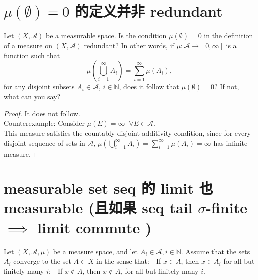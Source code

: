 \documentclass[lang=cn,11pt]{elegantbook}
\begin{document}
\section{\(\mu(\emptyset) = 0\) 的定义并非 redundant}
Let \((X, \mathcal{A})\) be a measurable space. Is the condition \(\mu(\emptyset) = 0\) in the definition of a measure on \((X, \mathcal{A})\) redundant? In other words, if \(\mu : \mathcal{A} \to [0, \infty]\) is a function such that
\[
\mu\left(\bigcup_{i=1}^\infty A_i\right) = \sum_{i=1}^\infty \mu(A_i),
\]
for any disjoint subsets \(A_i \in \mathcal{A}\), \(i \in \mathbb{N}\), does it follow that \(\mu(\emptyset) = 0\)? If not, what can you say?
\begin{proof}
    It does not follow.\\
    Counterexample: Consider $\mu(E) = \infty \;\; \forall E \in \mathcal{A}$.\\
    This measure satisfies the countably disjoint additivity condition, since for every disjoint sequence of sets in $\mathcal{A}$, $\mu\left(\bigcup_{i=1}^\infty A_i\right) = \sum_{i=1}^\infty \mu(A_i) = \infty$ has infinite measure. 
\end{proof}


\section{measurable set seq 的 limit 也 measurable (且如果 seq tail $\sigma$-finite $\implies$ limit commute )}
Let \((X, \mathcal{A}, \mu)\) be a measure space, and let \(A_i \in \mathcal{A}, i \in \mathbb{N}\). Assume that the sets \(A_i\) converge to the set \(A \subset X\) in the sense that:
- If \(x \in A\), then \(x \in A_i\) for all but finitely many \(i\);
- If \(x \notin A\), then \(x \notin A_i\) for all but finitely many \(i\).
\end{document}
